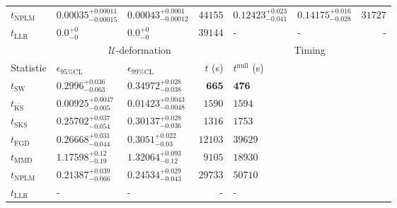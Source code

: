 \begin{tabular}{l|llr|llr}
\rowcolor{red!35}	$t_{\mathrm{NPLM}}$ & $0.00035_{-0.00015}^{+0.00011}$ & $0.00043_{-0.00012}^{+0.0001}$ & $44155$ & $0.12423_{-0.041}^{+0.023}$ & $0.14175_{-0.028}^{+0.016}$ & $31727$ \\
	$t_{\mathrm{LLR}}$ & $0.0_{-0}^{+0}$ & $0.0_{-0}^{+0}$ & $39144$ & - & - & - \\
	\toprule
	\multicolumn{1}{c}{} & \multicolumn{3}{c}{$\mathcal{U}$-deformation} & \multicolumn{3}{c}{Timing} \\
	Statistic & $\epsilon_{95\%\mathrm{CL}}$ & $\epsilon_{99\%\mathrm{CL}}$ & $t$ (s) & $t^{\mathrm{null}}$ (s) \\
	\midrule
	$t_{\mathrm{SW}}$ & $0.2996_{-0.063}^{+0.036}$ & $0.34972_{-0.038}^{+0.028}$ & ${\mathbf{665}}$ & ${\mathbf{476}}$ \\
	$t_{\overline{\mathrm{KS}}}$ & ${\mathbf{0.00925_{-0.005}^{+0.0047}}}$ & ${\mathbf{0.01423_{-0.0048}^{+0.0043}}}$ & $1590$ & $1594$ \\
	$t_{\mathrm{SKS}}$ & $0.25702_{-0.054}^{+0.037}$ & $0.30137_{-0.036}^{+0.028}$ & $1316$ & $1753$ \\
	$t_{\mathrm{FGD}}$ & $0.26668_{-0.044}^{+0.031}$ & $0.3051_{-0.03}^{+0.022}$ & $12103$ & $39629$ \\
	$t_{\mathrm{MMD}}$ & $1.17598_{-0.19}^{+0.12}$ & $1.32064_{-0.12}^{+0.093}$ & $9105$ & $18930$ \\
\rowcolor{red!35}	$t_{\mathrm{NPLM}}$ & $0.21387_{-0.066}^{+0.039}$ & $0.24534_{-0.043}^{+0.029}$ & $29733$ & $50710$ \\
	$t_{\mathrm{LLR}}$ & - & - & - & - \\
	\bottomrule
\end{tabular}